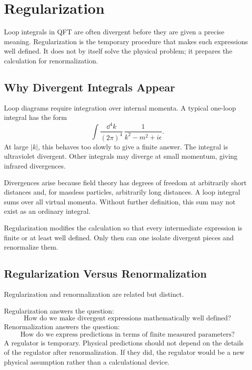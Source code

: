 \chapter{Regularization}

\begin{remarkbox}
Loop integrals in QFT are often divergent before they are given a precise
meaning. Regularization is the temporary procedure that makes such expressions
well defined. It does not by itself solve the physical problem; it prepares the
calculation for renormalization.
\end{remarkbox}

\section{Why Divergent Integrals Appear}

Loop diagrams require integration over internal momenta. A typical one-loop
integral has the form
\[
    \int\frac{\dd^4k}{(2\pi)^4}\,
    \frac{1}{k^2-m^2+i\epsilon}.
\]
At large \(|k|\), this behaves too slowly to give a finite answer. The integral
is ultraviolet divergent. Other integrals may diverge at small momentum, giving
infrared divergences.

Divergences arise because field theory has degrees of freedom at arbitrarily
short distances and, for massless particles, arbitrarily long distances. A loop
integral sums over all virtual momenta. Without further definition, this sum may
not exist as an ordinary integral.

Regularization modifies the calculation so that every intermediate expression is
finite or at least well defined. Only then can one isolate divergent pieces and
renormalize them.

\section{Regularization Versus Renormalization}

Regularization and renormalization are related but distinct.

Regularization answers the question:
\[
    \text{How do we make divergent expressions mathematically well defined?}
\]
Renormalization answers the question:
\[
    \text{How do we express predictions in terms of finite measured parameters?}
\]
A regulator is temporary. Physical predictions should not depend on the details
of the regulator after renormalization. If they did, the regulator would be a new
physical assumption rather than a calculational device.

